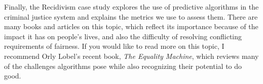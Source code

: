 Finally, the Recidivism case study explores the use of predictive
algorithms in the criminal justice system and explains the metrics we
use to assess them. There are many books and articles on this topic,
which reflect its importance because of the impact it has on people's
lives, and also the difficulty of resolving conflicting requirements of
fairness. If you would like to read more on this topic, I recommend Orly
Lobel's recent book, \emph{The Equality Machine}, which reviews many of
the challenges algorithms pose while also recognizing their potential to
do good.


